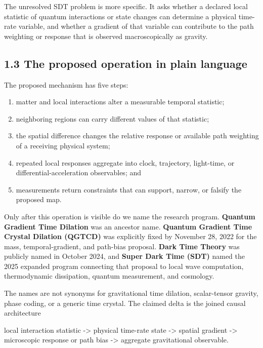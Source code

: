 \documentclass[
  american,
  11pt,
  letterpaper,
]{article}
\newenvironment{Shaded}{}{}
\newcommand{\NormalTok}[1]{#1}
\providecommand{\tightlist}{%
  \setlength{\itemsep}{0pt}\setlength{\parskip}{0pt}}
\begin{document}
The unresolved SDT problem is more specific. It asks whether a declared local statistic of quantum interactions or state changes can determine a physical time-rate variable, and whether a gradient of that variable can contribute to the path weighting or response that is observed macroscopically as gravity.

\subsection{1.3 The proposed operation in plain language}\label{the-proposed-operation-in-plain-language}

The proposed mechanism has five steps:

\begin{enumerate}
\def\labelenumi{\arabic{enumi}.}
\tightlist
\item
  matter and local interactions alter a measurable temporal statistic;
\item
  neighboring regions can carry different values of that statistic;
\item
  the spatial difference changes the relative response or available path weighting of a receiving physical system;
\item
  repeated local responses aggregate into clock, trajectory, light-time, or differential-acceleration observables; and
\item
  measurements return constraints that can support, narrow, or falsify the proposed map.
\end{enumerate}

Only after this operation is visible do we name the research program. \textbf{Quantum Gradient Time Dilation} was an ancestor name. \textbf{Quantum Gradient Time Crystal Dilation (QGTCD)} was explicitly fixed by November 28, 2022 for the mass, temporal-gradient, and path-bias proposal. \textbf{Dark Time Theory} was publicly named in October 2024, and \textbf{Super Dark Time (SDT)} named the 2025 expanded program connecting that proposal to local wave computation, thermodynamic dissipation, quantum measurement, and cosmology.

The names are not synonyms for gravitational time dilation, scalar-tensor gravity, phase coding, or a generic time crystal. The claimed delta is the joined causal architecture

\begin{Shaded}
\begin{Highlighting}[]
\NormalTok{local interaction statistic}
\NormalTok{    {-}\textgreater{} physical time{-}rate state}
\NormalTok{    {-}\textgreater{} spatial gradient}
\NormalTok{    {-}\textgreater{} microscopic response or path bias}
\NormalTok{    {-}\textgreater{} aggregate gravitational observable.}
\end{Highlighting}
\end{Shaded}
\end{document}
